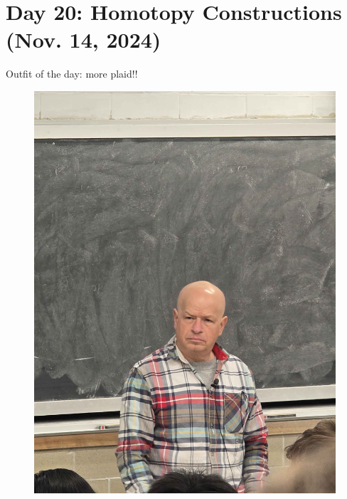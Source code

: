 \section{Day 20: Homotopy Constructions (Nov. 14, 2024)}
Outfit of the day: more plaid!!
\begin{figure}[h]
    \centering
    \includegraphics[scale=0.1]{MAT327 Notes/Dror Shirts/dror day 20 shirt.jpg}
\end{figure}

